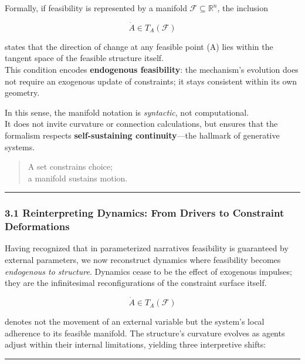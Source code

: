 \documentclass[11pt]{article}
\begin{document}
Formally, if feasibility is represented by a manifold
\(\mathcal{F}\subseteq \mathbb{R}^n\), the inclusion

\[
\dot{A}\in T_A(\mathcal{F})
\]

states that the direction of change at any feasible point (A) lies
within the tangent space of the feasible structure itself.\\
This condition encodes \textbf{endogenous feasibility}: the mechanism's
evolution does not require an exogenous update of constraints; it stays
consistent within its own geometry.

In this sense, the manifold notation is \emph{syntactic}, not
computational.\\
It does not invite curvature or connection calculations, but ensures
that the formalism respects \textbf{self-sustaining continuity}---the
hallmark of generative systems.

\begin{quote}
A set constrains choice;\\
a manifold sustains motion.
\end{quote}

\begin{center}\rule{0.5\linewidth}{0.5pt}\end{center}

\subsubsection{\texorpdfstring{3.1 \textbf{Reinterpreting Dynamics: From
Drivers to Constraint
Deformations}}{3.1 Reinterpreting Dynamics: From Drivers to Constraint Deformations}}\label{reinterpreting-dynamics-from-drivers-to-constraint-deformations}

Having recognized that in parameterized narratives feasibility is
guaranteed by external parameters, we now reconstruct dynamics where
feasibility becomes \emph{endogenous to structure}. Dynamics cease to be
the effect of exogenous impulses; they are the infinitesimal
reconfigurations of the constraint surface itself.

\[
\dot{A} \in T_A(\mathcal{F})
\]

denotes not the movement of an external variable but the system's local
adherence to its feasible manifold. The structure's curvature evolves as
agents adjust within their internal limitations, yielding three
interpretive shifts:

\begin{center}\rule{0.5\linewidth}{0.5pt}\end{center}
\end{document}
